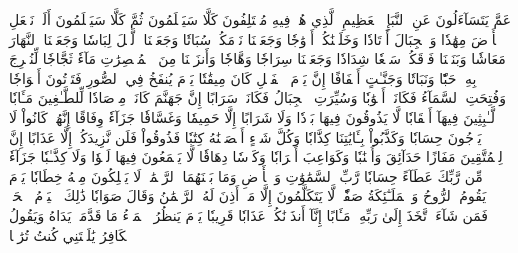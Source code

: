 عَمَّ يَتَسَآءَلُونَ
عَنِ ٱلنَّبَإِ ٱلۡعَظِيمِ
ٱلَّذِي هُمۡ فِيهِ مُخۡتَلِفُونَ
كَلَّا سَيَعۡلَمُونَ
ثُمَّ كَلَّا سَيَعۡلَمُونَ
أَلَمۡ نَجۡعَلِ ٱلۡأَرۡضَ مِهَٰدٗا
وَٱلۡجِبَالَ أَوۡتَادٗا
وَخَلَقۡنَٰكُمۡ أَزۡوَٰجٗا
وَجَعَلۡنَا نَوۡمَكُمۡ سُبَاتٗا
وَجَعَلۡنَا ٱلَّيۡلَ لِبَاسٗا
وَجَعَلۡنَا ٱلنَّهَارَ مَعَاشٗا
وَبَنَيۡنَا فَوۡقَكُمۡ سَبۡعٗا شِدَادٗا
وَجَعَلۡنَا سِرَاجٗا وَهَّاجٗا
وَأَنزَلۡنَا مِنَ ٱلۡمُعۡصِرَٰتِ مَآءٗ ثَجَّاجٗا
لِّنُخۡرِجَ بِهِۦ حَبّٗا وَنَبَاتٗا
وَجَنَّـٰتٍ أَلۡفَافًا
إِنَّ يَوۡمَ ٱلۡفَصۡلِ كَانَ مِيقَٰتٗا
يَوۡمَ يُنفَخُ فِي ٱلصُّورِ فَتَأۡتُونَ أَفۡوَاجٗا
وَفُتِحَتِ ٱلسَّمَآءُ فَكَانَتۡ أَبۡوَٰبٗا
وَسُيِّرَتِ ٱلۡجِبَالُ فَكَانَتۡ سَرَابًا
إِنَّ جَهَنَّمَ كَانَتۡ مِرۡصَادٗا
لِّلطَّـٰغِينَ مَـَٔابٗا
لَّـٰبِثِينَ فِيهَآ أَحۡقَابٗا
لَّا يَذُوقُونَ فِيهَا بَرۡدٗا وَلَا شَرَابًا
إِلَّا حَمِيمٗا وَغَسَّاقٗا
جَزَآءٗ وِفَاقًا
إِنَّهُمۡ كَانُواْ لَا يَرۡجُونَ حِسَابٗا
وَكَذَّبُواْ بِـَٔايَٰتِنَا كِذَّابٗا
وَكُلَّ شَيۡءٍ أَحۡصَيۡنَٰهُ كِتَٰبٗا
فَذُوقُواْ فَلَن نَّزِيدَكُمۡ إِلَّا عَذَابًا
إِنَّ لِلۡمُتَّقِينَ مَفَازًا
حَدَآئِقَ وَأَعۡنَٰبٗا
وَكَوَاعِبَ أَتۡرَابٗا
وَكَأۡسٗا دِهَاقٗا
لَّا يَسۡمَعُونَ فِيهَا لَغۡوٗا وَلَا كِذَّـٰبٗا
جَزَآءٗ مِّن رَّبِّكَ عَطَآءً حِسَابٗا
رَّبِّ ٱلسَّمَٰوَٰتِ وَٱلۡأَرۡضِ وَمَا بَيۡنَهُمَا ٱلرَّحۡمَٰنِۖ لَا يَمۡلِكُونَ مِنۡهُ خِطَابٗا
يَوۡمَ يَقُومُ ٱلرُّوحُ وَٱلۡمَلَـٰٓئِكَةُ صَفّٗاۖ لَّا يَتَكَلَّمُونَ إِلَّا مَنۡ أَذِنَ لَهُ ٱلرَّحۡمَٰنُ وَقَالَ صَوَابٗا
ذَٰلِكَ ٱلۡيَوۡمُ ٱلۡحَقُّۖ فَمَن شَآءَ ٱتَّخَذَ إِلَىٰ رَبِّهِۦ مَـَٔابًا
إِنَّآ أَنذَرۡنَٰكُمۡ عَذَابٗا قَرِيبٗا يَوۡمَ يَنظُرُ ٱلۡمَرۡءُ مَا قَدَّمَتۡ يَدَاهُ وَيَقُولُ ٱلۡكَافِرُ يَٰلَيۡتَنِي كُنتُ تُرَٰبَۢا